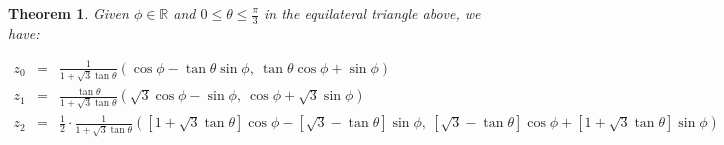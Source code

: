 \documentclass[twoside]{article}
\newtheorem{theorem}{Theorem}[section]
\begin{document}
\vspace{1cm}
\begin{theorem} Given $ \phi\in\mathbb{R} $ and $ 0\le\theta\le\frac{\pi}{3} $ in the equilateral triangle above, we have:
\end{theorem}

\begin{eqnarray*}
z_0 & = & \frac{1}{1+\sqrt{3}\tan\theta} (\cos\phi-\tan\theta\sin\phi,\ \tan\theta\cos\phi+\sin\phi) \\
z_1 & = & \frac{\tan\theta}{1+\sqrt{3}\tan\theta} (\sqrt{3}\cos\phi-\sin\phi,\ \cos\phi+\sqrt{3}\sin\phi) \\
z_2 & = & \frac{1}{2}\cdot\frac{1}{1+\sqrt{3}\tan\theta} ([1+\sqrt{3}\tan\theta]\cos\phi-[\sqrt{3}-\tan\theta]\sin\phi,
	  \ [\sqrt{3}-\tan\theta]\cos\phi+[1+\sqrt{3}\tan\theta]\sin\phi)
\end{eqnarray*}
\end{document}
